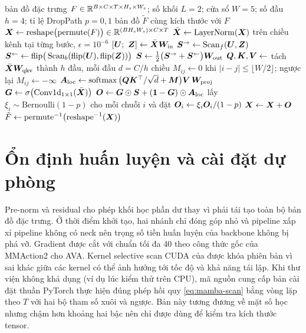 \begin{algorithm}[htbp]
\caption{Lan truyền thuận của neck Hybrid FGTN-Mamba tại một tầng đặc trưng (chế độ )}
\label{alg:block}
\begin{algorithmic}[1]
\Require bản đồ đặc trưng $F \in \mathbb{R}^{B \times C \times T \times H_s \times W_s}$; số khối $L = 2$; cửa sổ $W = 5$; số đầu $h = 4$; tỉ lệ DropPath $p = 0{,}1$
\Ensure bản đồ $\tilde{F}$ cùng kích thước với $F$
\State $\bm{X} \gets \mathrm{reshape}\big(\mathrm{permute}(F)\big) \in \mathbb{R}^{(B H_s W_s) \times C \times T}$ 
  \State $\bar{\bm{X}} \gets \operatorname{LayerNorm}(\bm{X})$ trên chiều kênh tại từng bước, $\epsilon = 10^{-6}$
  \State $[\bm{U};\ \bm{Z}] \gets \bar{\bm{X}}\bm{W}_{\text{in}}$ 
  \State $\bm{S}^{\rightarrow} \gets \operatorname{Scan}_f(\bm{U}, \bm{Z})$ 
  \State $\bm{S}^{\leftarrow} \gets \mathrm{flip}\big(\operatorname{Scan}_b(\mathrm{flip}(\bm{U}), \mathrm{flip}(\bm{Z}))\big)$
  \State $\bm{S} \gets \tfrac{1}{2}\big(\bm{S}^{\rightarrow} + \bm{S}^{\leftarrow}\big)\bm{W}_{\text{out}}$ 
  \State $\bm{Q}, \bm{K}, \bm{V} \gets$ tách $\bar{\bm{X}}\bm{W}_{\text{qkv}}$ thành $h$ đầu, mỗi đầu $d = C/h$ chiều
  \State $M_{ij} \gets 0$ khi $|i - j| \leq \lfloor W/2 \rfloor$; ngược lại $M_{ij} \gets -\infty$
  \State $\bm{A}_{\text{loc}} \gets \operatorname{softmax}\big(\bm{Q}\bm{K}^{\top}/\sqrt{d} + \bm{M}\big)\bm{V}\,\bm{W}_{\text{proj}}$ 
  \State $\bm{G} \gets \sigma\big(\mathrm{Conv1d}_{1 \times 1}(\bar{\bm{X}})\big)$ 
  \State $\bm{O} \gets \bm{G} \odot \bm{S} + (\bm{1} - \bm{G}) \odot \bm{A}_{\text{loc}}$
    \State lấy $\xi_i \sim \mathrm{Bernoulli}(1 - p)$ cho mỗi chuỗi $i$ và đặt $\bm{O}_i \gets \xi_i \bm{O}_i / (1 - p)$
  \EndIf
  \State $\bm{X} \gets \bm{X} + \bm{O}$ 
\EndFor
\State \Return $\tilde{F} \gets \mathrm{permute}^{-1}\big(\mathrm{reshape}^{-1}(\bm{X})\big)$
\end{algorithmic}
\end{algorithm}

\section{Ổn định huấn luyện và cài đặt dự phòng}
\label{sec:stability}

Pre-norm và residual cho phép khối học phần dư thay vì phải tái tạo toàn bộ bản đồ đặc trưng. Ở thời điểm khởi tạo, hai nhánh chỉ đóng góp nhỏ và pipeline xấp xỉ pipeline không có neck nên trọng số tiền huấn luyện của backbone không bị phá vỡ. Gradient được cắt với chuẩn tối đa 40 theo công thức gốc của MMAction2 cho AVA. Kernel selective scan CUDA của  được khóa phiên bản vì sai khác giữa các kernel có thể ảnh hưởng tới tốc độ và khả năng tái lập. Khi thư viện  không khả dụng (ví dụ lúc kiểm thử trên CPU), mã nguồn cung cấp bản cài đặt thuần PyTorch  thực hiện đúng phép hồi quy \cref{eq:mamba-scan} bằng vòng lặp theo $T$ với hai bộ tham số xuôi và ngược. Bản này tương đương về mặt số học nhưng chậm hơn khoảng hai bậc nên chỉ được dùng để kiểm tra kích thước tensor.

